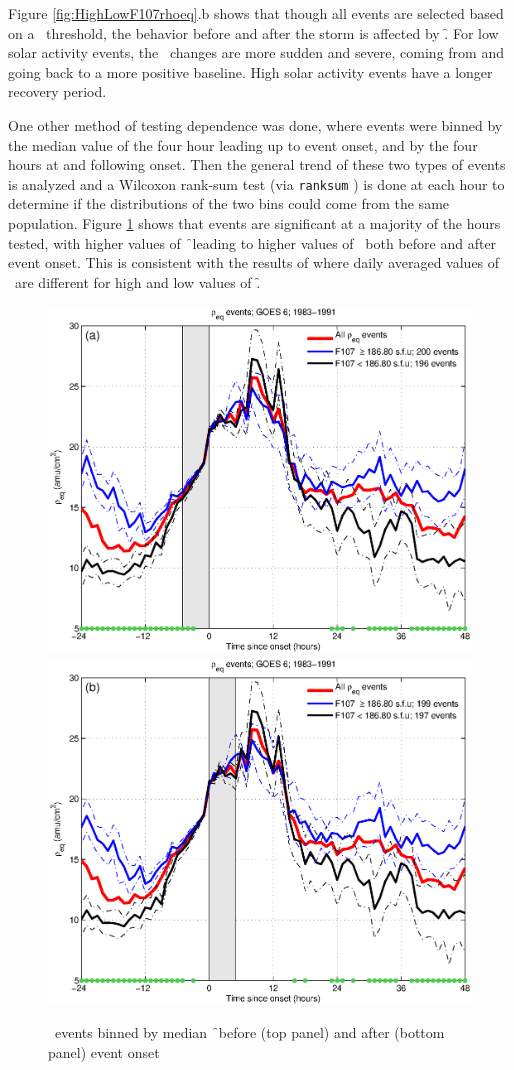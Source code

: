 Figure \ref{fig:HighLowF107rhoeq}.b shows that though all events are selected based on a \dst\ threshold, the behavior before and after the storm is affected by \f. For low solar activity events, the \dst\ changes are more sudden and severe, coming from and going back to a more positive baseline. High solar activity events have a longer recovery period.

One other method of testing dependence was done, where events were binned by the median value of the four hour leading up to event onset, and by the four hours at and following onset. Then the general trend of these two types of events is analyzed and a Wilcoxon rank-sum test (via \texttt{ranksum} \citep{MATLAB:2014}) is done at each hour to determine if the distributions of the two bins could come from the same population. Figure \ref{fig:RhoBinnedF107} shows that events are significant at a majority of the hours tested, with higher values of \f\ leading to higher values of \req\ both before and after event onset. This is consistent with the results of \cite{Denton2016} where daily averaged values of \req\ are different for high and low values of \f.

\begin{figure}[htp!]
	\centering
	\includegraphics[width=0.7\linewidth]{Figures/RhoBinnedF107-case24-t020-tf25-GOES6}
	\includegraphics[width=0.7\linewidth]{Figures/RhoBinnedF107-case24-t025-tf30-GOES6}	
	\caption{\req\ events binned by median \f\ before (top panel) and after (bottom panel) event onset}
	\label{fig:RhoBinnedF107}
\end{figure}



